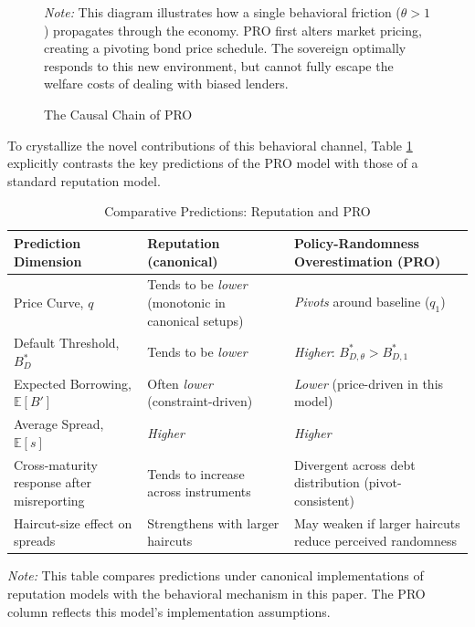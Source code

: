 \documentclass[12pt]{article}
\theoremstyle{plain}
\begin{document}
\begin{figure}[htb]
\begin{tikzpicture}
	\end{tikzpicture}
	\caption{The Causal Chain of PRO}
	\label{fig:causal_chain}
	\parbox{\linewidth}{\small\textit{Note:} This diagram illustrates how a single behavioral friction ($\theta > 1$) propagates through the economy. PRO first alters market pricing, creating a pivoting bond price schedule. The sovereign optimally responds to this new environment, but cannot fully escape the welfare costs of dealing with biased lenders.}
\end{figure}
To crystallize the novel contributions of this behavioral channel, Table
\ref{tab:prediction_comparison} explicitly contrasts the key predictions of the
PRO model with those of a standard reputation model.

\begin{table}[h!]
	\centering
	\caption{Comparative Predictions: Reputation and PRO}
	\label{tab:prediction_comparison}
	\begin{tabularx}{\textwidth}{@{}lXX@{}}
		\toprule
		Prediction Dimension                       & Reputation (canonical) \citep{ColeDowEnglish1995, MorelliMoretti2023} & Policy-Randomness Overestimation (PRO)                    \\ \midrule
		Price Curve, $q$                           & Tends to be \textit{lower} (monotonic in canonical setups)            & \textit{Pivots} around baseline ($q_1$)                   \\
		Default Threshold, $B^*_D$                 & Tends to be \textit{lower}                                            & \textit{Higher}: $B^*_{D,\theta} > B^*_{D,1}$             \\
		Expected Borrowing, $\mathbb{E}[B']$       & Often \textit{lower} (constraint-driven)                              & \textit{Lower} (price-driven in this model)               \\
		Average Spread, $\mathbb{E}[s]$            & \textit{Higher}                                                       & \textit{Higher}                                           \\
		Cross-maturity response after misreporting & Tends to increase across instruments                                  & Divergent across debt distribution (pivot-consistent)     \\
		Haircut-size effect on spreads             & Strengthens with larger haircuts \citep{AmadorPhelan2023}             & May weaken if larger haircuts reduce perceived randomness \\\bottomrule
	\end{tabularx}
	\parbox{\linewidth}{\small\textit{Note:} This table compares predictions under canonical implementations of reputation models with the behavioral mechanism in this paper. The PRO column reflects this model's implementation assumptions.}
\end{table}
\end{document}
